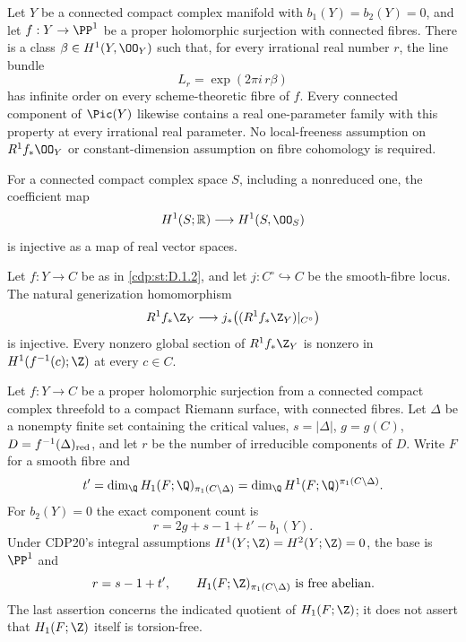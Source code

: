 
\begin{proposition}\hypertarget{tag-01G7}{}\label{cdp:st:D.1.9}


Let $Y$ be a connected compact complex manifold with
$b_1(Y)=b_2(Y)=0$, and let $f:Y\to\PP^1$ be a proper
holomorphic surjection with connected fibres. There is a class
$\beta\in H^1(Y,\OO_Y)$ such that, for every irrational real number
$r$, the line bundle
\[
L_r=\exp(2\pi i\,r\beta)
\]
has infinite order on every scheme-theoretic fibre of $f$.
Every connected component of $\Pic(Y)$ likewise contains a real
one-parameter family with this property at every irrational real
parameter.
No local-freeness assumption on $R^1f_*\OO_Y$ or constant-dimension
assumption on fibre cohomology is required.
\end{proposition}

\begin{proposition}\hypertarget{tag-01G5}{}\label{cdp:st:D.1.7}


For a connected compact complex space $S$, including a nonreduced
one, the coefficient map
\[
H^1(S;\mathbb R)\longrightarrow H^1(S,\OO_S)
\]
is injective as a map of real vector spaces.
\end{proposition}

\begin{proposition}\hypertarget{tag-01G6}{}\label{cdp:st:D.1.8}


Let $f:Y\to C$ be as in \ref{cdp:st:D.1.2}, and let $j:C^\circ\hookrightarrow C$
be the smooth-fibre locus. The natural generization homomorphism
\[
R^1f_*\Z_Y\longrightarrow
j_*\bigl((R^1f_*\Z_Y)|_{C^\circ}\bigr)
\]
is injective. Every nonzero global section of $R^1f_*\Z_Y$ is
nonzero in $H^1(f^{-1}(c);\Z)$ at every $c\in C$.
\end{proposition}

\begin{proposition}\hypertarget{tag-01G0}{}\label{cdp:st:D.1.2}


Let $f:Y\to C$ be a proper holomorphic surjection from a connected
compact complex threefold to a compact Riemann surface, with
connected fibres. Let $\Delta$ be a nonempty finite set containing
the critical values, $s=|\Delta|$, $g=g(C)$,
$D=f^{-1}(\Delta)_{\rm red}$, and let $r$ be the number of
irreducible components of $D$. Write $F$ for a smooth fibre and
\[
t'=\dim_{\Q}H_1(F;\Q)_{\pi_1(C\setminus\Delta)}
   =\dim_{\Q}H^1(F;\Q)^{\pi_1(C\setminus\Delta)}.
\]
For $b_2(Y)=0$ the exact component count is
\[
\boxed{\quad r=2g+s-1+t'-b_1(Y).\quad}
\]
Under CDP20's integral assumptions
$H^1(Y;\Z)=H^2(Y;\Z)=0$, the base is $\PP^1$ and
\[
r=s-1+t',\qquad
H_1(F;\Z)_{\pi_1(C\setminus\Delta)}\text{ is free abelian}.
\]
The last assertion concerns the indicated quotient of $H_1(F;\Z)$;
it does not assert that $H_1(F;\Z)$ itself is torsion-free.
\end{proposition}

